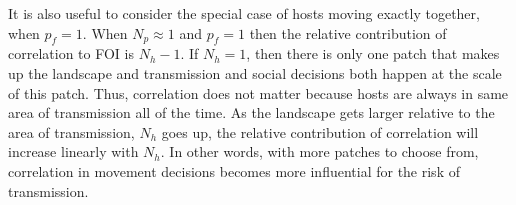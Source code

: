\documentclass[letterpaper]{article}
\begin{document}
It is also useful to consider the special case of hosts moving exactly together, when $p_f = 1$.  When $N_p \approx 1$ and $p_f = 1$ then the relative contribution of correlation to FOI is $N_h - 1$.  %
If $N_h = 1$, then there is only one patch that makes up the landscape and transmission and social decisions both happen at the scale of this patch. Thus, correlation does not matter because hosts are always in same area of transmission all of the time.  As the landscape gets larger relative to the area of transmission, $N_h$ goes up,  the relative contribution of correlation will increase linearly with $N_h$.  In other words, with more patches to choose from, correlation in movement decisions becomes more influential for the risk of transmission. 






\end{document}

